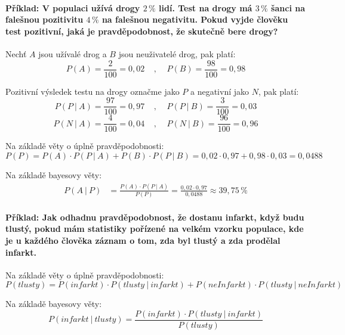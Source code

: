 \paragraph*{Příklad: V populaci užívá drogy $2\,\%$ lidí. Test na drogy má $3\,\%$ šanci na falešnou pozitivitu $4\,\%$ na falešnou negativitu. Pokud vyjde člověku test pozitivní, jaká je pravděpodobnost, že skutečně bere drogy?}

\begin{compactitem}
    \item Nechť $A$ jsou užívalé drog a $B$ jsou neuživatelé drog, pak platí:
    $$ P(A) = \frac{2}{100} = 0,02 ~~~~~,~~~~~ P(B) = \frac{98}{100} = 0,98$$

    \item Pozitivní výsledek testu na drogy označme jako $P$ a negativní jako $N$, pak platí:
    $$ P(P ~|~ A) = \frac{97}{100} = 0,97 ~~~~~,~~~~~ P(P ~|~ B) = \frac{3}{100} = 0,03 $$
    $$ P(N ~|~ A) = \frac{4}{100} = 0,04 ~~~~~,~~~~~ P(N ~|~ B) = \frac{96}{100} = 0,96 $$

    \item Na základě věty o úplně pravděpodobnosti:
    $$ P(P) = P(A) \cdot P(P~|~A) + P(B) \cdot P(P~|~B) = 0,02 \cdot 0,97 + 0,98 \cdot 0,03 = 0,0488$$

    \item Na základě bayesovy věty:
    \begin{equation}
        \begin{split}
            P(A ~|~ P) &= \frac{ P(A) \cdot P(P ~|~ A) }{P(P)} = \frac{ 0,02 \cdot 0,97 }{0,0488} \approx 39,75\,\%
        \end{split}
    \end{equation}
\end{compactitem}

\paragraph*{Příklad: Jak odhadnu pravděpodobnost, že dostanu infarkt, když budu tlustý, pokud mám statistiky pořízené na velkém vzorku populace, kde je u každého člověka záznam o tom, zda byl tlustý a zda prodělal infarkt.}

\begin{compactitem}
    \item Na základě věty o úplně pravděpodobnosti:
    $$ P(tlusty) = P(infarkt) \cdot P(tlusty ~|~ infarkt) + P(neInfarkt) \cdot P(tlusty ~|~ neInfarkt)$$

    \item Na základě bayesovy věty:
    $$ P(infarkt ~|~ tlusty) = \frac{P(infarkt) \cdot P(tlusty ~|~ infarkt)}{P(tlusty)} $$
\end{compactitem}

